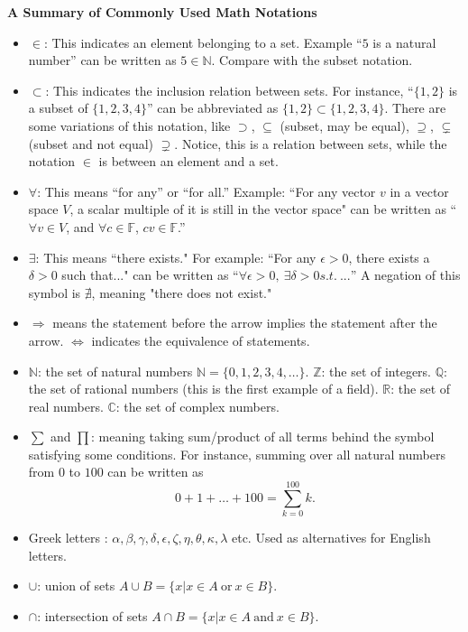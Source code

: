 \documentclass[11pt]{article}
\theoremstyle{plain}
\theoremstyle{definition}
\def\R{\mathbb R}
\def\Q{\mathbb Q}
\def\Z{\mathbb Z}
\def\N{\mathbb N}
\def\C{\mathbb C}
\def\F{\mathbb F}
\begin{document}
\begin{center}
{\Large \bf A Summary of Commonly Used Math Notations}
\end{center}

\begin{itemize}
\item $\in$: This indicates an element belonging to a set. Example ``$5$ is a natural number'' can be written as $5\in \N$. Compare with the subset notation.
\item $\subset$: This indicates the inclusion relation between sets. For instance, ``$\{1,2\}$ is a subset of $\{1,2,3,4\}$'' can be abbreviated as $\{1,2\}\subset \{1,2,3,4\}$. There are some variations of this notation, like $\supset$, $\subseteq$ (subset, may be equal), $\supseteq$, $\subsetneq$ (subset and not equal) $\supsetneq$. Notice, this is a relation between sets, while the notation $\in$ is between an element and a set. 
\item $\forall$: This means ``for any'' or ``for all.'' Example: ``For any vector $v$ in a vector space $V$, a scalar multiple of it is still in the vector space" can be written as ``$\forall v\in V$, and $\forall c\in \F$, $cv\in \F$.''
\item $\exists$: This means ``there exists." For example: ``For any $\epsilon>0$, there exists a $\delta>0$ such that..." can be written as ``$\forall \epsilon>0,~\exists \delta>0 s.t.~...$'' A negation of this symbol is $\nexists$, meaning "there does not exist."
\item $\Rightarrow$ means the statement before the arrow implies the statement after the arrow. $\Leftrightarrow$ indicates the equivalence of statements.
\item $\N$: the set of natural numbers $\N=\{0,1,2,3,4,\dots\}$. $\Z$: the set of integers. $\Q$: the set of rational numbers (this is the first example of a field). $\R$: the set of real numbers. $\C$: the set of complex numbers.
\item $\sum$ and $\prod$: meaning taking sum/product of all terms behind the symbol satisfying some conditions. For instance, summing over all natural numbers from $0$ to $100$ can be written as
    \[
    0+1+\dots+100=\sum_{k=0}^{100} k.
    \]
\item Greek letters : $\alpha,\beta,\gamma,\delta,\epsilon,\zeta,\eta,\theta,\kappa,\lambda$ etc. Used as alternatives for English letters.
\item $\cup$: union of sets $A\cup B=\{x|x\in A~\textrm{or}~x\in B\}$. 
\item $\cap$: intersection of sets $A\cap B=\{x|x\in A~\textrm{and}~x\in B\}$.
\end{itemize}
\end{document}
